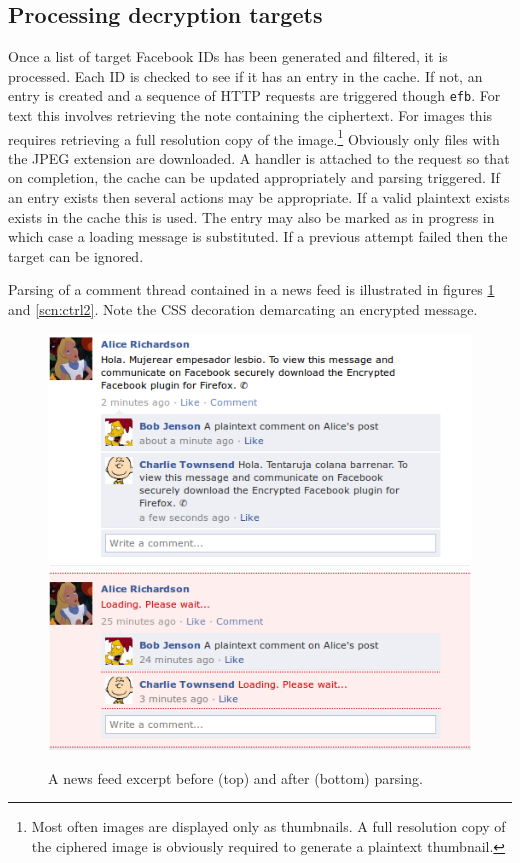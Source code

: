     
\subsection{Processing decryption targets}
\label{ssec:proc-targets}


Once a list of target Facebook IDs has been generated and filtered, it is processed. Each ID is checked to see if it has an entry in the cache. If not, an entry is created and a sequence of HTTP requests are triggered though {\tt efb}. For text this involves retrieving the note containing the ciphertext. For images this requires retrieving a full resolution copy of the image.\footnote{Most often images are displayed only as thumbnails. A full resolution copy of the ciphered image is obviously required to generate a plaintext thumbnail.} Obviously only files with the JPEG extension are downloaded. A handler is attached to the request so that on completion, the cache can be updated appropriately and parsing triggered. If an entry exists then several actions may be appropriate. If a valid plaintext exists exists in the cache this is used. The entry may also be marked as in progress in which case a loading message is substituted. If a previous attempt failed then the target can be ignored.

Parsing of a comment thread contained in a news feed is illustrated in figures \ref{scn:ctrl} and \ref{scn:ctrl2}. Note the CSS decoration demarcating an encrypted message.

    \begin{figure}[tbph]
        \begin{center}
                \includegraphics[width=12cm]{screens/content1.png}
                \includegraphics[width=12cm]{screens/content4.png}
            \caption{A news feed excerpt before (top) and after (bottom) parsing.}
            \label{scn:ctrl}
        \end{center}
    \end{figure}
    

